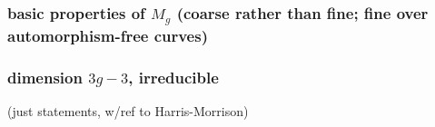 \subsubsection{basic properties of $M_g$ (coarse rather than fine; fine over automorphism-free curves)}

\subsubsection{dimension $3g-3$, irreducible}  (just statements, w/ref to Harris-Morrison)



%
%
%
%
%
%
%
%
%
%
%
%
%
%
%
